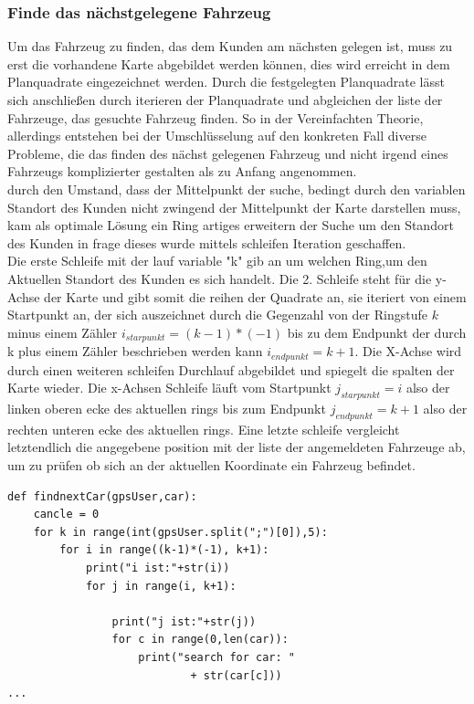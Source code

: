 \documentclass[conference]{IEEEtran}
\begin{document}
\subsubsection{Finde das nächstgelegene Fahrzeug}
Um das Fahrzeug  zu finden,  das dem Kunden am nächsten  gelegen ist, muss zu erst die vorhandene Karte abgebildet werden können, dies wird erreicht in dem Planquadrate eingezeichnet werden. Durch die festgelegten Planquadrate lässt sich anschließen durch iterieren der Planquadrate und abgleichen der liste der Fahrzeuge, das gesuchte Fahrzeug finden. So in der Vereinfachten Theorie, allerdings entstehen bei der Umschlüsselung auf den konkreten Fall diverse Probleme, die das finden des nächst gelegenen Fahrzeug und nicht irgend eines Fahrzeugs komplizierter gestalten als zu Anfang angenommen.\\
durch den Umstand, dass der Mittelpunkt der suche, bedingt durch den variablen Standort des Kunden nicht zwingend der Mittelpunkt der Karte darstellen muss, kam als optimale Lösung ein Ring artiges erweitern der Suche um den Standort des Kunden in frage dieses wurde mittels schleifen Iteration geschaffen.\\
Die erste Schleife mit der lauf variable "k" gib an um welchen Ring,um den Aktuellen Standort des Kunden es sich handelt. Die 2. Schleife steht für die y-Achse der Karte und gibt somit die reihen der Quadrate an, sie iteriert von einem Startpunkt an, der sich auszeichnet durch die Gegenzahl von der Ringstufe $k$ minus einem Zähler $i_{starpunkt} = (k-1)*(-1)$ bis zu dem Endpunkt der durch k plus einem Zähler beschrieben werden kann $i_{endpunkt} = k+1$. Die X-Achse wird durch einen weiteren schleifen Durchlauf abgebildet und spiegelt die spalten der Karte wieder. Die x-Achsen Schleife läuft vom Startpunkt $j_{starpunkt} = i $ also der linken oberen ecke des aktuellen rings bis zum Endpunkt $j_{endpunkt} = k+1$ also der rechten unteren ecke des aktuellen rings. Eine letzte schleife vergleicht letztendlich die angegebene position mit der liste der angemeldeten Fahrzeuge ab, um zu prüfen ob sich an der aktuellen Koordinate ein Fahrzeug befindet. 
\begin{lstlisting}
def findnextCar(gpsUser,car):
    cancle = 0
    for k in range(int(gpsUser.split(";")[0]),5):
        for i in range((k-1)*(-1), k+1):
            print("i ist:"+str(i))
            for j in range(i, k+1):

                print("j ist:"+str(j))
                for c in range(0,len(car)):
                    print("search for car: "
                    		+ str(car[c]))
...
\end{lstlisting}
\end{document}
